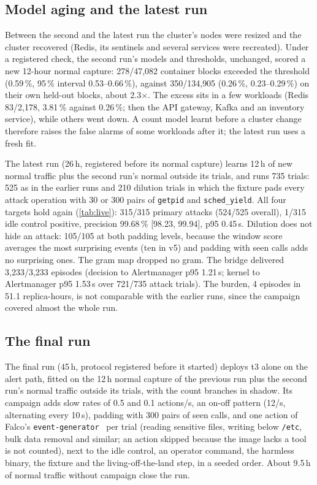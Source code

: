 \subsection{Model aging and the latest run}\label{sec:eval-v6}

Between the second and the latest run the cluster's nodes were resized and the cluster recovered (Redis, its sentinels
and several services were recreated). Under a registered check, the second run's models and thresholds, unchanged,
scored a new 12-hour normal capture: 278/47{,}082 container blocks exceeded the threshold (0.59\,\%, 95\,\% interval
0.53--0.66\,\%), against 350/134{,}905 (0.26\,\%, 0.23--0.29\,\%) on their own held-out blocks, about 2.3$\times$. The
excess sits in a few workloads (Redis 83/2{,}178, 3.81\,\% against 0.26\,\%; then the API gateway, Kafka and an
inventory service), while others went down. A count model learnt before a cluster change therefore raises the false
alarms of some workloads after it; the latest run uses a fresh fit.

The latest run (26\,h, registered before its normal capture) learns 12\,h of new normal traffic plus the second run's
normal outside its trials, and runs 735 trials: 525 as in the earlier runs and 210 dilution trials in which the fixture
pads every attack operation with 30 or 300 pairs of \texttt{getpid} and \texttt{sched\_yield}. All four targets hold
again (\cref{tab:live}): 315/315 primary attacks (524/525 overall), 1/315 idle control positive, precision 99.68\,\%
[98.23, 99.94], p95 0.45\,s. Dilution does not hide an attack: 105/105 at both padding levels, because the window score
averages the most surprising events (ten in v5) and padding with seen calls adds no surprising ones. The gram map dropped no
gram. The bridge delivered 3{,}233/3{,}233 episodes (decision to Alertmanager p95 1.21\,s; kernel to Alertmanager p95
1.53\,s over 721/735 attack trials). The burden, 4 episodes in 51.1 replica-hours, is not comparable with the earlier
runs, since the campaign covered almost the whole run.

\subsection{The final run}\label{sec:eval-final}

The final run (45\,h, protocol registered before it started) deploys t3 alone on the alert path, fitted on the 12\,h
normal capture of the previous run plus the second run's normal traffic outside its trials, with the count branches in
shadow. Its campaign adds slow rates of 0.5 and 0.1 actions/s, an on-off pattern (12/s, alternating every 10\,s),
padding with 300 pairs of seen calls, and one action of Falco's \texttt{event-generator}~\cite{falco} per trial
(reading sensitive files, writing below \texttt{/etc}, bulk data removal and similar; an action skipped because the image
lacks a tool is not counted), next to the idle control, an operator command, the harmless binary, the fixture and the
living-off-the-land step, in a seeded order. About 9.5\,h of normal traffic without campaign close the run.

